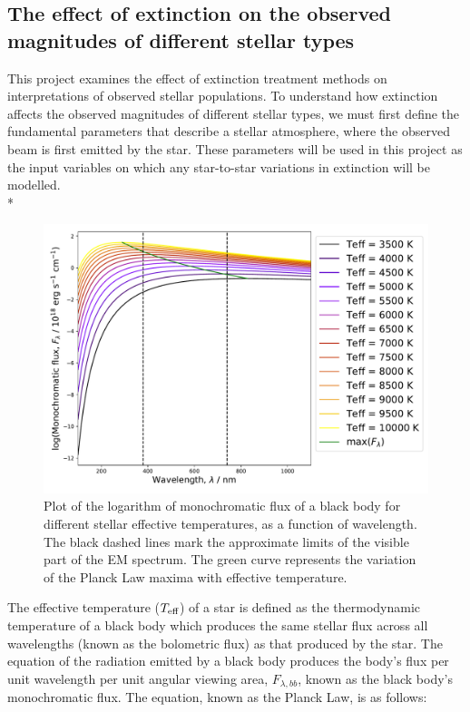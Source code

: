 \documentclass[12pt, a4paper]{report}
\begin{document}
\subsection{The effect of extinction on the observed magnitudes of different stellar types} \label{params}


This project examines the effect of extinction treatment methods on interpretations of observed stellar populations. To understand how extinction affects the observed magnitudes of different stellar types, we must first define the fundamental parameters that describe a stellar atmosphere, where the observed beam is first emitted by the star. These parameters will be used in this project as the input variables on which any star-to-star variations in extinction will be modelled. \\*

\begin{figure}[h!]
\begin{center}
\includegraphics[width=1.0\textwidth]{blackbody_teff_logF_illustration.pdf}
\caption{Plot of the logarithm of monochromatic flux of a black body for different stellar effective temperatures, as a function of wavelength. The black dashed lines mark the approximate limits of the visible part of the EM spectrum. The green curve represents the variation of the Planck Law maxima with effective temperature.}
\label{planck_curve}
\end{center}
\end{figure}

The effective temperature ($T_{\textnormal{eff}}$) of a star is defined as the thermodynamic temperature of a black body which produces the same stellar flux across all wavelengths (known as the bolometric flux) as that produced by the star. The equation of the radiation emitted by a black body produces the body's flux per unit wavelength per unit angular viewing area, $F_{\lambda,bb}$, known as the black body's monochromatic flux. The equation, known as the Planck Law, is as follows:
\end{document}
